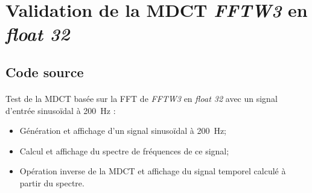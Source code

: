 \documentclass{article}
\begin{document}

\newpage
\section{Validation de la MDCT \emph{FFTW3} en \emph{float 32}}\label{app:fftw3_example}
\subsection{Code source}\label{app:fftw3_example_code}
\paragraph{}
Test de la MDCT basée sur la FFT de \emph{FFTW3} en \emph{float 32} avec un signal d'entrée sinusoïdal à \SI{200}{\hertz} :
\begin{itemize}
    \item Génération et affichage d'un signal sinusoïdal à \SI{200}{\hertz};
    \item Calcul et affichage du spectre de fréquences de ce signal;
    \item Opération inverse de la MDCT et affichage du signal temporel calculé à partir du spectre.
\end{itemize}
\end{document}
